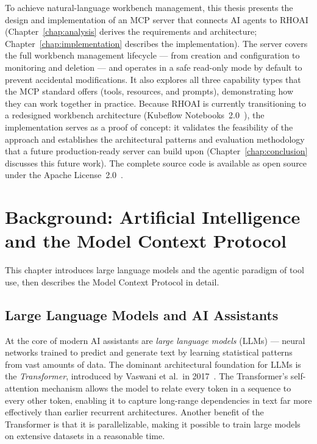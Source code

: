 \documentclass[
  digital,     %
  oneside,     %
  nosansbold,  %
  nocolorbold, %
  lof,         %
  lot,         %
]{fithesis4}
\begin{document}
To achieve natural-language workbench management, this thesis presents the design and implementation of an
MCP server that connects AI agents to RHOAI (Chapter~\ref{chap:analysis}
derives the requirements and architecture; Chapter~\ref{chap:implementation}
describes the implementation). The server covers the full workbench
management lifecycle --- from creation and configuration to monitoring and
deletion --- and operates in a safe read-only mode by default to prevent
accidental modifications. It also explores all three capability types that
the MCP standard offers (tools, resources, and prompts), demonstrating how
they can work together in practice. Because RHOAI is currently transitioning
to a redesigned workbench architecture
(Kubeflow Notebooks~2.0~\parencite{notebooks-v2}), the implementation serves
as a proof of concept: it validates the feasibility of the approach and
establishes the architectural patterns and evaluation methodology that a
future production-ready server can build upon
(Chapter~\ref{chap:conclusion} discusses this future work). The complete
source code is available as open source under the Apache License~2.0~\parencite{mcp-server-rhoai-repo}.


\chapter{Background: Artificial Intelligence and the Model Context Protocol}
\label{chap:ai-mcp}

This chapter introduces large language models and the agentic paradigm of tool
use, then describes the Model Context Protocol in detail.

\section{Large Language Models and AI Assistants}
\label{sec:llms}

At the core of modern AI assistants are \textit{large language models}
(LLMs) --- neural networks trained to predict and generate text by learning
statistical patterns from vast amounts of data. The dominant architectural
foundation for LLMs is the \textit{Transformer}, introduced by Vaswani et
al.\ in 2017~\parencite{vaswani2017attention}. The Transformer's
self-attention mechanism allows the model to relate every token in a
sequence to every other token, enabling it to capture long-range
dependencies in text far more effectively than earlier recurrent
architectures. Another benefit of the Transformer is that it is parallelizable,
making it possible to train large models on extensive datasets in a reasonable
time.
\end{document}
